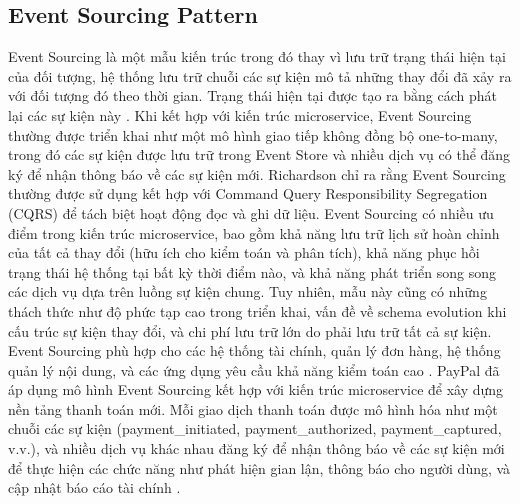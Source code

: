 \subsection{Event Sourcing Pattern}
Event Sourcing là một mẫu kiến trúc trong đó thay vì lưu trữ trạng thái hiện tại của đối tượng, hệ thống lưu trữ chuỗi các sự kiện mô tả những thay đổi đã xảy ra với đối tượng đó theo thời gian. Trạng thái hiện tại được tạo ra bằng cách phát lại các sự kiện này \cite{fowler2002}.
Khi kết hợp với kiến trúc microservice, Event Sourcing thường được triển khai như một mô hình giao tiếp không đồng bộ one-to-many, trong đó các sự kiện được lưu trữ trong Event Store và nhiều dịch vụ có thể đăng ký để nhận thông báo về các sự kiện mới. Richardson \cite{richardson2019} chỉ ra rằng Event Sourcing thường được sử dụng kết hợp với Command Query Responsibility Segregation (CQRS) để tách biệt hoạt động đọc và ghi dữ liệu.
Event Sourcing có nhiều ưu điểm trong kiến trúc microservice, bao gồm khả năng lưu trữ lịch sử hoàn chỉnh của tất cả thay đổi (hữu ích cho kiểm toán và phân tích), khả năng phục hồi trạng thái hệ thống tại bất kỳ thời điểm nào, và khả năng phát triển song song các dịch vụ dựa trên luồng sự kiện chung.
Tuy nhiên, mẫu này cũng có những thách thức như độ phức tạp cao trong triển khai, vấn đề về schema evolution khi cấu trúc sự kiện thay đổi, và chi phí lưu trữ lớn do phải lưu trữ tất cả sự kiện. Event Sourcing phù hợp cho các hệ thống tài chính, quản lý đơn hàng, hệ thống quản lý nội dung, và các ứng dụng yêu cầu khả năng kiểm toán cao \cite{richardson2019}.
PayPal đã áp dụng mô hình Event Sourcing kết hợp với kiến trúc microservice để xây dựng nền tảng thanh toán mới. Mỗi giao dịch thanh toán được mô hình hóa như một chuỗi các sự kiện (payment\_initiated, payment\_authorized, payment\_captured, v.v.), và nhiều dịch vụ khác nhau đăng ký để nhận thông báo về các sự kiện mới để thực hiện các chức năng như phát hiện gian lận, thông báo cho người dùng, và cập nhật báo cáo tài chính \cite{raman2016}.
